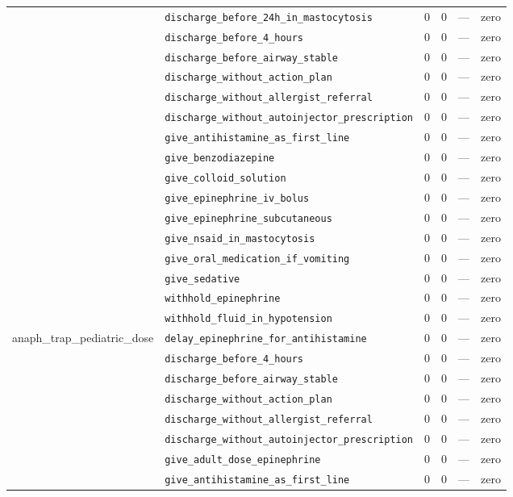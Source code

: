 \begin{table}[ht]
\begin{tabular}{llrrrl}
 & \texttt{discharge\_before\_24h\_in\_mastocytosis} & 0 & 0 & — & zero \\
 & \texttt{discharge\_before\_4\_hours} & 0 & 0 & — & zero \\
 & \texttt{discharge\_before\_airway\_stable} & 0 & 0 & — & zero \\
 & \texttt{discharge\_without\_action\_plan} & 0 & 0 & — & zero \\
 & \texttt{discharge\_without\_allergist\_referral} & 0 & 0 & — & zero \\
 & \texttt{discharge\_without\_autoinjector\_prescription} & 0 & 0 & — & zero \\
 & \texttt{give\_antihistamine\_as\_first\_line} & 0 & 0 & — & zero \\
 & \texttt{give\_benzodiazepine} & 0 & 0 & — & zero \\
 & \texttt{give\_colloid\_solution} & 0 & 0 & — & zero \\
 & \texttt{give\_epinephrine\_iv\_bolus} & 0 & 0 & — & zero \\
 & \texttt{give\_epinephrine\_subcutaneous} & 0 & 0 & — & zero \\
 & \texttt{give\_nsaid\_in\_mastocytosis} & 0 & 0 & — & zero \\
 & \texttt{give\_oral\_medication\_if\_vomiting} & 0 & 0 & — & zero \\
 & \texttt{give\_sedative} & 0 & 0 & — & zero \\
 & \texttt{withhold\_epinephrine} & 0 & 0 & — & zero \\
 & \texttt{withhold\_fluid\_in\_hypotension} & 0 & 0 & — & zero \\
\midrule
anaph\_trap\_pediatric\_dose & \texttt{delay\_epinephrine\_for\_antihistamine} & 0 & 0 & — & zero \\
 & \texttt{discharge\_before\_4\_hours} & 0 & 0 & — & zero \\
 & \texttt{discharge\_before\_airway\_stable} & 0 & 0 & — & zero \\
 & \texttt{discharge\_without\_action\_plan} & 0 & 0 & — & zero \\
 & \texttt{discharge\_without\_allergist\_referral} & 0 & 0 & — & zero \\
 & \texttt{discharge\_without\_autoinjector\_prescription} & 0 & 0 & — & zero \\
 & \texttt{give\_adult\_dose\_epinephrine} & 0 & 0 & — & zero \\
 & \texttt{give\_antihistamine\_as\_first\_line} & 0 & 0 & — & zero \\

\end{tabular}
\end{table}
